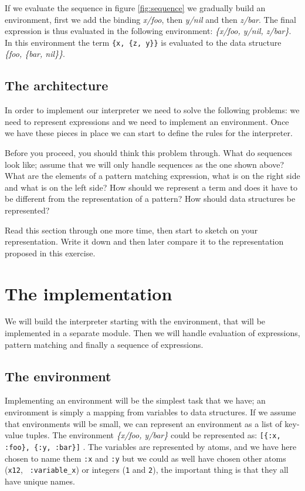\documentclass[a4paper,11pt]{article}
\begin{document}
If we evaluate the sequence in figure \ref{fig:sequence} we gradually
build an environment, first we add the binding {\em x/foo}, then {\em
  y/nil} and then {\em z/bar}. The final expression is thus evaluated
in the following environment: {\em \{x/foo, y/nil, z/bar\}}. In this
environment the term \verb+{x, {z, y}}+ is evaluated to the data
structure {\em \{foo, \{bar, nil\}\}}.

\subsection{The architecture}
In order to implement our interpreter we need to solve the following
problems: we need to represent expressions and we need to implement an
environment. Once we have these pieces in place we can start to define
the rules for the interpreter.

Before you proceed, you should think this problem through. What do
sequences look like; assume that we will only handle sequences as the
one shown above? What are the elements of a pattern
matching expression, what is on the right side and what is on the left
side? How should we represent a term and does it have to be different
from the representation of a pattern? How should data structures be
represented?

Read this section through one more time, then start to sketch on your
representation. Write it down and then later compare it to the
representation proposed in this exercise. 


\section{The implementation}

We will build the interpreter starting with the environment, that will
be implemented in a separate module. Then we will handle evaluation
of expressions, pattern matching and finally a sequence of
expressions.

\subsection{The environment}

Implementing an environment will be the simplest task that we have; an
environment is simply a mapping from variables to data structures. If
we assume that environments will be small, we can represent an
environment as a list of key-value tuples. The environment {\em
  \{x/foo, y/bar\}} could be represented as:
\verb+[{:x, :foo}, {:y, :bar}]+ . The variables are represented by
atoms, and we have here chosen to name them {\tt :x} and {\tt :y} but
we could as well have chosen other atoms ({\tt x12}, {\tt
  :variable\_x}) or integers ({\tt 1} and {\tt 2}), the important
thing is that they all have unique names.
\end{document}
